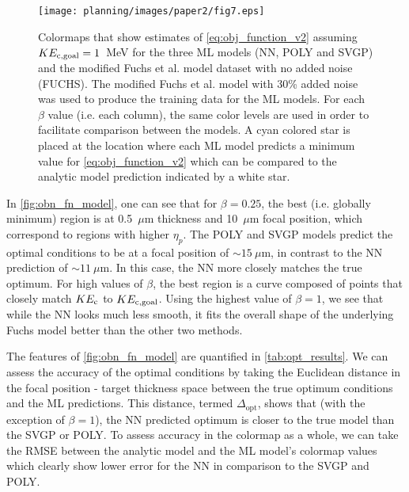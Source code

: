\begin{figure}
	\centering
	\texttt{[image: planning/images/paper2/fig7.eps]}
	\vspace{-0.4cm}
	\caption{Colormaps that show estimates of \autoref{eq:obj_function_v2} assuming $KE_{\rm c,goal} = 1$~MeV for the three ML models (NN, POLY and SVGP) and the modified Fuchs et al. model dataset with no added noise (FUCHS). The modified Fuchs et al. model with 30\% added noise was used to produce the training data for the ML models. For each $\beta$ value (i.e. each column), the same color levels are used in order to facilitate comparison between the models. A cyan colored star is placed at the location where each ML model predicts a minimum value for \autoref{eq:obj_function_v2} which can be compared to the analytic model prediction indicated by a white star.}
	\label{fig:obn_fn_model}
\end{figure}

In \autoref{fig:obn_fn_model}, one can see that for $\beta = 0.25$, the best (i.e. globally minimum) region is at 0.5~$\mu$m thickness and 10~$\mu$m focal position, which correspond to regions with higher $\eta_{p}$. The \gls{POLY} and \gls{SVGP} models predict the optimal conditions to be at a focal position of $\sim15~\mu$m, in contrast to the \gls{NN} prediction of $\sim11~\mu$m. In this case, the \gls{NN} more closely matches the true optimum. For high values of $\beta$, the best region is a curve composed of points that closely match $KE_{\rm c}$ to $KE_{\rm c,goal}$. Using the highest value of $\beta = 1$, we see that while the \gls{NN} looks much less smooth, it fits the overall shape of the underlying Fuchs model better than the other two methods.

The features of \autoref{fig:obn_fn_model} are quantified in \autoref{tab:opt_results}. We can assess the accuracy of the optimal conditions by taking the Euclidean distance in the focal position - target thickness space between the true optimum conditions and the \gls{ML} predictions. This distance, termed $\Delta_\text{opt}$, shows that (with the exception of $\beta=1$), the \gls{NN} predicted optimum is closer to the true model than the \gls{SVGP} or \gls{POLY}. To assess accuracy in the colormap as a whole, we can take the \gls{RMSE} between the analytic model and the ML model's colormap values which clearly show lower error for the \gls{NN} in comparison to the \gls{SVGP} and \gls{POLY}.

